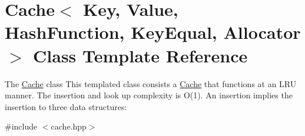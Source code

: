 \hypertarget{class_cache}{}\section{Cache$<$ Key, Value, Hash\+Function, Key\+Equal, Allocator $>$ Class Template Reference}
\label{class_cache}


The \mbox{\hyperlink{class_cache}{Cache}} class This templated class consists a \mbox{\hyperlink{class_cache}{Cache}} that functions at an L\+RU manner. The insertion and look up complexity is O(1). An insertion implies the insertion to three data structures\+:  




{\ttfamily \#include $<$cache.\+hpp$>$}

